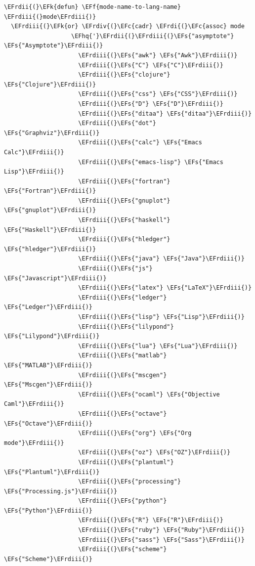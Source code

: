 \documentclass{scrartcl}
\newcommand{\EFk}[1]{\textcolor{EFk}{#1}} %
\newcommand{\EFs}[1]{\textcolor{EFs}{#1}} %
\newcommand{\EFc}[1]{\textcolor{EFc}{#1}} %
\newcommand{\EFf}[1]{\textcolor{EFf}{#1}} %
\newcommand{\EFhq}[1]{\textcolor{EFhq}{#1}} %
\newcommand{\EFrdi}[1]{\textcolor{EFrdi}{#1}} %
\newcommand{\EFrdii}[1]{\textcolor{EFrdii}{#1}} %
\newcommand{\EFrdiii}[1]{\textcolor{EFrdiii}{#1}} %
\newcommand{\EFrdiv}[1]{\textcolor{EFrdiv}{#1}} %
\begin{document}
\begin{Code}
\begin{Verbatim}[]
\EFrdii{(}\EFk{defun} \EFf{mode-name-to-lang-name} \EFrdiii{(}mode\EFrdiii{)}
  \EFrdiii{(}\EFk{or} \EFrdiv{(}\EFc{cadr} \EFrdi{(}\EFc{assoc} mode
                   \EFhq{'}\EFrdii{(}\EFrdiii{(}\EFs{"asymptote"} \EFs{"Asymptote"}\EFrdiii{)}
                     \EFrdiii{(}\EFs{"awk"} \EFs{"Awk"}\EFrdiii{)}
                     \EFrdiii{(}\EFs{"C"} \EFs{"C"}\EFrdiii{)}
                     \EFrdiii{(}\EFs{"clojure"} \EFs{"Clojure"}\EFrdiii{)}
                     \EFrdiii{(}\EFs{"css"} \EFs{"CSS"}\EFrdiii{)}
                     \EFrdiii{(}\EFs{"D"} \EFs{"D"}\EFrdiii{)}
                     \EFrdiii{(}\EFs{"ditaa"} \EFs{"ditaa"}\EFrdiii{)}
                     \EFrdiii{(}\EFs{"dot"} \EFs{"Graphviz"}\EFrdiii{)}
                     \EFrdiii{(}\EFs{"calc"} \EFs{"Emacs Calc"}\EFrdiii{)}
                     \EFrdiii{(}\EFs{"emacs-lisp"} \EFs{"Emacs Lisp"}\EFrdiii{)}
                     \EFrdiii{(}\EFs{"fortran"} \EFs{"Fortran"}\EFrdiii{)}
                     \EFrdiii{(}\EFs{"gnuplot"} \EFs{"gnuplot"}\EFrdiii{)}
                     \EFrdiii{(}\EFs{"haskell"} \EFs{"Haskell"}\EFrdiii{)}
                     \EFrdiii{(}\EFs{"hledger"} \EFs{"hledger"}\EFrdiii{)}
                     \EFrdiii{(}\EFs{"java"} \EFs{"Java"}\EFrdiii{)}
                     \EFrdiii{(}\EFs{"js"} \EFs{"Javascript"}\EFrdiii{)}
                     \EFrdiii{(}\EFs{"latex"} \EFs{"LaTeX"}\EFrdiii{)}
                     \EFrdiii{(}\EFs{"ledger"} \EFs{"Ledger"}\EFrdiii{)}
                     \EFrdiii{(}\EFs{"lisp"} \EFs{"Lisp"}\EFrdiii{)}
                     \EFrdiii{(}\EFs{"lilypond"} \EFs{"Lilypond"}\EFrdiii{)}
                     \EFrdiii{(}\EFs{"lua"} \EFs{"Lua"}\EFrdiii{)}
                     \EFrdiii{(}\EFs{"matlab"} \EFs{"MATLAB"}\EFrdiii{)}
                     \EFrdiii{(}\EFs{"mscgen"} \EFs{"Mscgen"}\EFrdiii{)}
                     \EFrdiii{(}\EFs{"ocaml"} \EFs{"Objective Caml"}\EFrdiii{)}
                     \EFrdiii{(}\EFs{"octave"} \EFs{"Octave"}\EFrdiii{)}
                     \EFrdiii{(}\EFs{"org"} \EFs{"Org mode"}\EFrdiii{)}
                     \EFrdiii{(}\EFs{"oz"} \EFs{"OZ"}\EFrdiii{)}
                     \EFrdiii{(}\EFs{"plantuml"} \EFs{"Plantuml"}\EFrdiii{)}
                     \EFrdiii{(}\EFs{"processing"} \EFs{"Processing.js"}\EFrdiii{)}
                     \EFrdiii{(}\EFs{"python"} \EFs{"Python"}\EFrdiii{)}
                     \EFrdiii{(}\EFs{"R"} \EFs{"R"}\EFrdiii{)}
                     \EFrdiii{(}\EFs{"ruby"} \EFs{"Ruby"}\EFrdiii{)}
                     \EFrdiii{(}\EFs{"sass"} \EFs{"Sass"}\EFrdiii{)}
                     \EFrdiii{(}\EFs{"scheme"} \EFs{"Scheme"}\EFrdiii{)}

\end{Verbatim}
\end{Code}
\end{document}
